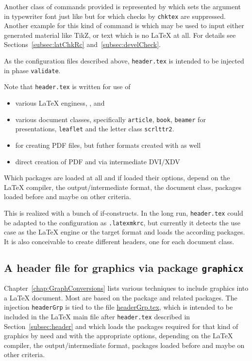 Another class of commands provided is represented by  
which sets the argument in typewriter font 
just like  but for which checks by \texttt{chktex} are suppressed. 
Another example for this kind of command is  
which may be used to input either generated material like TikZ,
or text which is no \LaTeX{} at all. 
For details see Sections~\ref{subsec:latChkRc} and~\ref{subsec:develCheck}. 
\medskip


As the configuration files described above, 
\texttt{header.tex} is intended to be injected in phase \texttt{validate}. 

Note that \texttt{header.tex} is written for use of 
%
\begin{itemize}
  \item various \LaTeX{} enginess, \lualatex, \xelatex{} and \pdflatex{} 
  \item various document classes, 
  specifically \texttt{article}, \texttt{book}, \texttt{beamer} for presentations, 
  \texttt{leaflet} and the letter class \texttt{scrlttr2}. 
  \item for creating PDF files, but futher formats created with  as well
  \item direct creation of PDF and via intermediate DVI/XDV 
\end{itemize}

Which packages are loaded at all and if loaded their options, 
depend on the \LaTeX{} compiler, the output/intermediate format, 
the document class, packages loaded before and maybe on other criteria. 

This is realized with a bunch of if-constructs. 
In the long run, \texttt{header.tex} could be adapted 
to the configuration as \texttt{.latexmkrc}, 
but currently it detects the use case 
as the \LaTeX{} engine or the target format 
and loads the according packages. 
It is also conceivable to create different headers, one for each document class. 


\subsection{A header file for graphics via package \texttt{graphicx} }%
\label{subsec:headerGrp}

Chapter~\ref{chap:GraphConversions} lists various techniques 
to include graphics into a \LaTeX{} document. 
Most are based on the package  and related packages. 
The injection \texttt{headerGrp} 
is tied to the file \href{\urlSite fromTex/headerGrp.tex}{headerGrp.tex}, 
which is intended to be included in the \LaTeX{} main file 
after \texttt{header.tex} described in Section~\ref{subsec:header} 
and which loads the packages required for that kind of graphics 
by need and with the appropriate options, 
depending on the \LaTeX{} compiler, the output/intermediate format, 
packages loaded before and maybe on other criteria. 


